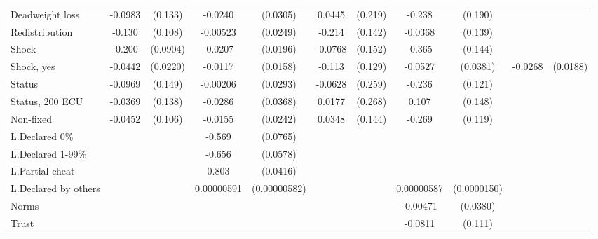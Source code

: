 {\begin{tabular}{l*{5}{cc}}
Deadweight loss &  -0.0983         &  (0.133)&  -0.0240         & (0.0305)&   0.0445         &  (0.219)&   -0.238         &  (0.190)&                  &         \\
Redistribution  &   -0.130         &  (0.108)& -0.00523         & (0.0249)&   -0.214         &  (0.142)&  -0.0368         &  (0.139)&                  &         \\
Shock           &   -0.200\sym{**} & (0.0904)&  -0.0207         & (0.0196)&  -0.0768         &  (0.152)&   -0.365\sym{**} &  (0.144)&                  &         \\
Shock, yes      &  -0.0442\sym{**} & (0.0220)&  -0.0117         & (0.0158)&   -0.113         &  (0.129)&  -0.0527         & (0.0381)&  -0.0268         & (0.0188)\\
Status          &  -0.0969         &  (0.149)& -0.00206         & (0.0293)&  -0.0628         &  (0.259)&   -0.236\sym{*}  &  (0.121)&                  &         \\
Status, 200 ECU &  -0.0369         &  (0.138)&  -0.0286         & (0.0368)&   0.0177         &  (0.268)&    0.107         &  (0.148)&                  &         \\
Non-fixed       &  -0.0452         &  (0.106)&  -0.0155         & (0.0242)&   0.0348         &  (0.144)&   -0.269\sym{**} &  (0.119)&                  &         \\
L.Declared 0\%  &                  &         &   -0.569\sym{***}& (0.0765)&                  &         &                  &         &                  &         \\
L.Declared 1-99\%&                  &         &   -0.656\sym{***}& (0.0578)&                  &         &                  &         &                  &         \\
L.Partial cheat &                  &         &    0.803\sym{***}& (0.0416)&                  &         &                  &         &                  &         \\
L.Declared by others&                  &         &0.00000591         &(0.00000582)&                  &         &0.00000587         &(0.0000150)&                  &         \\
Norms           &                  &         &                  &         &                  &         & -0.00471         & (0.0380)&                  &         \\
Trust           &                  &         &                  &         &                  &         &  -0.0811         &  (0.111)&                  &         \\

\end{tabular}}
